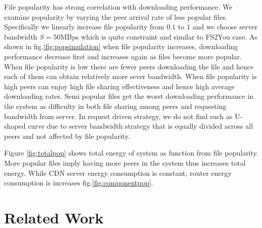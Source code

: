 \documentclass[conference]{IEEEtran}
\begin{document}

File popularity has strong correlation with downloading performance. 
We examine popularity by varying the peer arrival rate of less popular files.
Specifically we linearly increase file popularity from $0.1$ to $1$ and we choose server bandwidth $S=50$MBps which is quite constraint and similar to FS2You case.
As shown in fig.\ref{fig:popsimulation} when file popularity increases, downloading performance decrease first and increases again as files become more popular.
When file popularity is low there are fewer peers downloading the file and hence each of them can obtain relatively more sever bandwidth.
When file popularity is high peers can enjoy high file sharing effectiveness and hence high average downloading rates.
Semi popular files get the worst downloading performance in the system as difficulty in both file sharing among peers and requesting bandwidth from server.
In request driven strategy, we do not find such as U-shaped curve due to server bandwidth strategy that is equally divided across all peers and not affected by file popularity.

Figure \ref{fig:totalpop} shows total energy of system as function from file popularity.  
More popular files imply having more peers in the system thus increases total energy.  
While CDN server energy consumption is constant, router energy consumption is increases fig.\ref{fig:componentpop}. 



\section{Related Work} 
\end{document}
